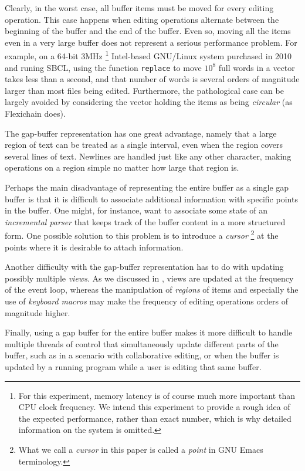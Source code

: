 Clearly, in the worst case, all buffer items must be moved for every
editing operation.  This case happens when editing operations
alternate between the beginning of the buffer and the end of the
buffer.  Even so, moving all the items even in a very large buffer
does not represent a serious performance problem.  For example, on a
64-bit 3MHz%
\footnote{For this experiment, memory latency is of course much more
  important than CPU clock frequency.  We intend this experiment to
  provide a rough idea of the expected performance, rather than exact
  number, which is why detailed information on the system is omitted.}
Intel-based GNU/Linux system purchased in 2010 and runing
SBCL, using the \commonlisp{} function \texttt{replace} to move $10^8$
full words in a vector takes less than a second, and that number of
words is several orders of magnitude larger than most files being
edited.  Furthermore, the pathological case can be largely avoided by
considering the vector holding the items as being \emph{circular} (as
Flexichain \cite{flexichain} does).

The gap-buffer representation has one great advantage, namely that a
large region of text can be treated as a single interval, even when
the region covers several lines of text.  Newlines are handled just
like any other character, making operations on a region simple no
matter how large that region is.

Perhaps the main disadvantage of representing the entire buffer as a
single gap buffer is that it is difficult to associate additional
information with specific points in the buffer.  One might, for
instance, want to associate some state of an \emph{incremental parser}
that keeps track of the buffer content in a more structured form.
One possible solution to this problem is to introduce a \emph{cursor}%
\footnote{What we call a \emph{cursor} in this paper is called a
  \emph{point} in GNU Emacs terminology.} at the points where it is
desirable to attach information.

Another difficulty with the gap-buffer representation has to do with
updating possibly multiple \emph{views}.  As we discussed in
, views are updated at the frequency of the
event loop, whereas the manipulation of \emph{regions} of items and
especially the use of \emph{keyboard macros} may make the frequency of
editing operations orders of magnitude higher.

Finally, using a gap buffer for the entire buffer makes it more
difficult to handle multiple threads of control that simultaneously
update different parts of the buffer, such as in a scenario with
collaborative editing, or when the buffer is updated by a running
program while a user is editing that same buffer.

